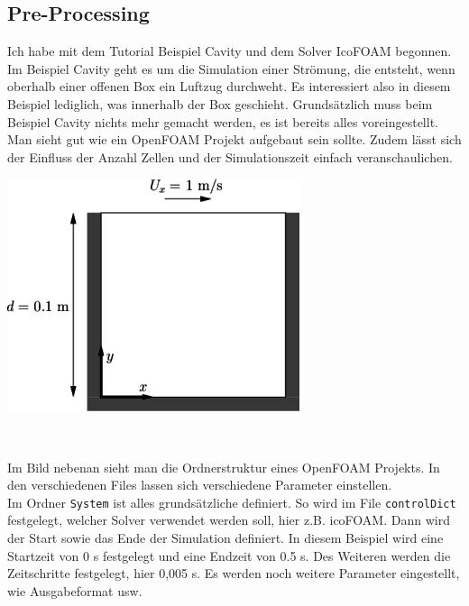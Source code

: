 \begin{refsection}
\subsection{Pre-Processing}
Ich habe mit dem Tutorial Beispiel Cavity und dem Solver IcoFOAM begonnen. Im Beispiel Cavity geht es um die Simulation einer Strömung, die entsteht, wenn oberhalb einer offenen Box ein Luftzug durchweht. Es interessiert also in diesem Beispiel lediglich, was innerhalb der Box geschieht. Grundsätzlich muss beim Beispiel Cavity nichts mehr gemacht werden, es ist bereits alles voreingestellt. Man sieht gut wie ein OpenFOAM Projekt aufgebaut sein sollte. Zudem lässt sich der Einfluss der Anzahl Zellen und der Simulationszeit einfach veranschaulichen. \\
\begin{minipage}{0.5 \linewidth}
\includegraphics[width =  \linewidth]{./OpenFOAM/Pics/cavity1.png} 
\end{minipage} 
\\
\begin{minipage}{0.5 \linewidth}
Im Bild nebenan sieht man die Ordnerstruktur eines OpenFOAM Projekts. In den verschiedenen Files lassen sich verschiedene Parameter einstellen. \\
Im Ordner  \texttt{System} ist alles grundsätzliche definiert. So wird im File  \texttt{controlDict} festgelegt, welcher Solver verwendet werden soll, hier z.B. icoFOAM. Dann wird der Start sowie das Ende der Simulation definiert. In diesem Beispiel wird eine Startzeit von 0 s festgelegt und eine Endzeit von 0.5 s. Des Weiteren werden die Zeitschritte festgelegt, hier 0,005 s. Es werden noch weitere Parameter eingestellt, wie Ausgabeformat usw. \\

\end{minipage}
\end{refsection}
